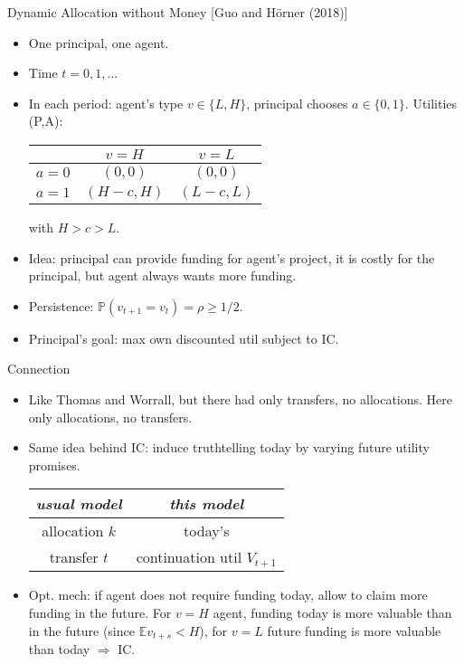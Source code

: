 \documentclass[english,10pt
,aspectratio=169
]{beamer}
\begin{document}
\begin{frame}{Dynamic Allocation without Money [Guo and H{\"o}rner (2018)]}
\begin{itemize}
	\item One principal, one agent.
	\item Time $t=0,1,...$
	\item In each period: agent's type $v \in \{L,H\}$, principal chooses $a \in \{0,1\}$. Utilities (P,A):
	\medskip
	\begin{center}
		\begin{tabular}{c | c | c |}
			& $v = H$ 	& $v=L$ \\ \hline
			$a=0$	& $(0,0)$ 	& $(0,0)$	\\ \hline
			$a=1$	& $(H-c,H)$ 	& $(L-c,L)$	\\ \hline
		\end{tabular}
	\end{center}
	\medskip
	with $H > c > L$.
	\item Idea: principal can provide funding for agent's project, it is costly for the principal, but agent always wants more funding.
	\item Persistence: $\mathbb{P}(v_{t+1} = v_t) = \rho \geq 1/2$.
	\item Principal's goal: max own discounted util subject to IC.
\end{itemize}
\end{frame}


\begin{frame}{Connection}
\begin{itemize}
	\item Like Thomas and Worrall, but there had only transfers, no allocations. Here only allocations, no transfers.
	\item Same idea behind IC: induce truthtelling today by varying future utility promises.
	\medskip
	\begin{center}
		\begin{tabular}{| c | c |}
			\hline
			\emph{usual model} 	& \emph{this model} \\ \hline
			allocation $k$ 	& today's \structure{allocation $a_t$}\\ \hline
			transfer $t$ 	& continuation util $V_{t+1}$\\ \hline
		\end{tabular}
	\end{center}
	\medskip
	\item Opt. mech: if agent does not require funding today, allow to claim more funding in the future. For $v=H$ agent, funding today is more valuable than in the future (since $\mathbb{E} v_{t+s} < H$), for $v=L$ future funding is more valuable than today $\Rightarrow$ IC.
\end{itemize}
\end{frame}
\end{document}
